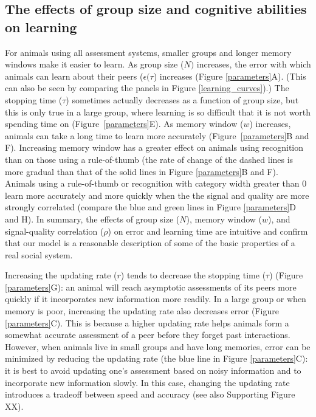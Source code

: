 \subsection*{The effects of group size and cognitive abilities on learning}
For animals using all assessment systems, smaller groups and longer memory windows make it easier to learn. As group size ($N)$ increases, the error with which animals can learn about their peers ($\epsilon(\tau$) increases (Figure \ref{parameters}A). (This can also be seen by comparing the panels in Figure \ref{learning_curves}).) The stopping time ($\tau$) sometimes actually decreases as a function of group size, but this is only true in a large group, where learning is so difficult that it is not worth spending time on (Figure~\ref{parameters}E).  As memory window ($w$) increases, animals can take a long time to learn more accurately (Figure~\ref{parameters}B and F). Increasing memory window has a greater effect on animals using recognition than on those using a rule-of-thumb (the rate of change of the dashed lines is more gradual than that of the solid lines in Figure \ref{parameters}B and F).  Animals using a rule-of-thumb or recognition with category width greater than $0$ learn more accurately and more quickly when the the signal and quality are more strongly correlated (compare the blue and green lines in Figure \ref{parameters}D and H). In summary, the effects of group size ($N$), memory window ($w$), and signal-quality correlation ($\rho$) on error and learning time are intuitive and confirm that our model is a reasonable description of some of the basic properties of a real social system. 
 
Increasing the updating rate ($r$) tends to decrease the stopping time ($\tau$) (Figure \ref{parameters}G): an animal will reach asymptotic assessments of its peers more quickly if it incorporates new information more readily. In a large group or when memory is poor, increasing the updating rate also decreases error (Figure \ref{parameters}C). This is because a higher updating rate helps animals form a somewhat accurate assessment of a peer before they forget past interactions. However, when animals live in small groups and have long memories, error can be minimized by reducing the updating rate (the blue line in Figure \ref{parameters}C): it is best to avoid updating one's assessment based on noisy information and to incorporate new information slowly. In this case, changing the updating rate introduces a tradeoff between speed and accuracy (see also Supporting Figure XX).
 
